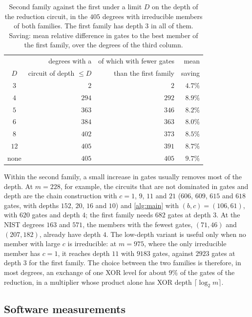 \documentclass{ieeeaccess}
\theoremstyle{plain}
\theoremstyle{definition}
\begin{document}
\begin{table}[t]
\centering\small
\caption{Second family against the first under a limit $D$ on the depth of
the reduction circuit, in the $405$ degrees with irreducible members of both
families. The first family has depth $3$ in all of them. Saving: mean
relative difference in gates to the best member of the first family, over the
degrees of the third column.}
\label{tab:depth}
\begin{tabular}{@{}c r r r@{}}
\toprule
    & degrees with a & of which with fewer gates & mean\\
$D$ & circuit of depth $\le D$ & than the first family & saving\\
\midrule
$3$  & $2$   & $2$   & $4.7\%$\\
$4$  & $294$ & $292$ & $8.9\%$\\
$5$  & $363$ & $346$ & $8.2\%$\\
$6$  & $384$ & $363$ & $8.0\%$\\
$8$  & $402$ & $373$ & $8.5\%$\\
$12$ & $405$ & $391$ & $8.7\%$\\
none & $405$ & $405$ & $9.7\%$\\
\bottomrule
\end{tabular}
\end{table}

Within the second family, a small increase in gates usually removes most of
the depth. At $m=228$, for example, the circuits that are not dominated in
gates and depth are the chain construction with $c=1$, $9$, $11$ and $21$
($606$, $609$, $615$ and $618$ gates, with depths $152$, $20$, $16$ and $10$)
and \cref{alg:main} with $(b,c)=(106,61)$, with $620$ gates and depth $4$; the
first family needs $682$ gates at depth $3$. At the NIST degrees $163$ and
$571$, the members with the fewest gates, $(71,46)$ and $(207,182)$, already
have depth $4$. The low-depth variant is useful only when no member with large
$c$ is irreducible: at $m=975$, where the only irreducible member has $c=1$,
it reaches depth $11$ with $9183$ gates, against $2923$ gates at depth $3$ for
the first family. The choice between the two families is therefore, in most
degrees, an exchange of one XOR level for about $9\%$ of the gates of the
reduction, in a multiplier whose product alone has XOR depth
$\lceil\log_2 m\rceil$.
\subsection{Software measurements}\label{sec:software}
\end{document}
